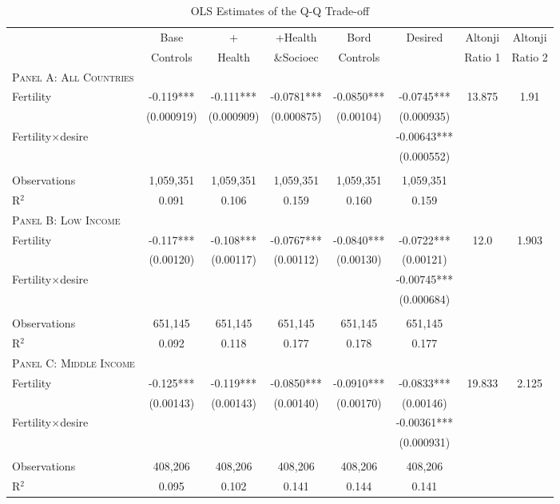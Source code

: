 \begin{landscape}\begin{table}[!htbp] \centering 
\caption{OLS Estimates of the Q-Q Trade-off} 
 \label{TWINtab:OLS} 
\begin{tabular}{lccccccc} \toprule \toprule 
&Base&+&+Health&Bord&Desired&Altonji&Altonji\\
&Controls&Health&\&Socioec&Controls&&Ratio 1&Ratio 2\\\midrule
\textsc{Panel A: All Countries}&&&&&&&\\
Fertility &-0.119***&-0.111***&-0.0781***&-0.0850***&-0.0745***&13.875&1.91\\
&(0.000919)&(0.000909)&(0.000875)&(0.00104)&(0.000935)&&\\
Fertility$\times$desire&&&&&-0.00643***&&\\
&&&&&(0.000552)&&\\
&&&&&&&\\
Observations &1,059,351&1,059,351&1,059,351&1,059,351&1,059,351&&\\
R$^2$&0.091&0.106&0.159&0.160&0.159&&\\\midrule
\textsc{Panel B: Low Income}&&&&&&&\\
Fertility &-0.117***&-0.108***&-0.0767***&-0.0840***&-0.0722***&12.0&1.903\\
&(0.00120)&(0.00117)&(0.00112)&(0.00130)&(0.00121)&&\\
Fertility$\times$desire&&&&&-0.00745***&&\\
&&&&&(0.000684)&&\\
&&&&&&&\\
Observations &651,145&651,145&651,145&651,145&651,145&&\\
R$^2$&0.092&0.118&0.177&0.178&0.177&&\\\midrule
\textsc{Panel C: Middle Income}&&&&&&&\\
Fertility &-0.125***&-0.119***&-0.0850***&-0.0910***&-0.0833***&19.833&2.125\\
&(0.00143)&(0.00143)&(0.00140)&(0.00170)&(0.00146)&&\\
Fertility$\times$desire&&&&&-0.00361***&&\\
&&&&&(0.000931)&&\\
&&&&&&&\\
Observations &408,206&408,206&408,206&408,206&408,206&&\\
R$^2$&0.095&0.102&0.141&0.144&0.141&&\\\hline\hline

\end{tabular}
\end{table}
\end{landscape}
